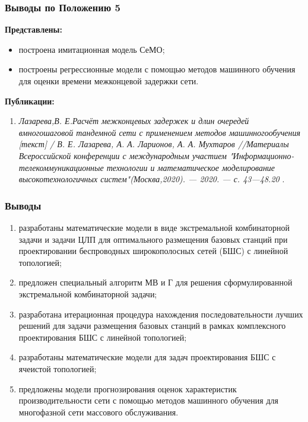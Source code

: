 \begin{frame}
    \frametitle{Выводы по Положению 5}
    \fontsize{8pt}{7.2}\selectfont

    \textbf{Представлены:}
    \begin{itemize}
        \item построена имитационная модель СеМО;
        \item построены регрессионные модели с помощью методов машинного обучения для оценки времени межконцевой задержки сети.
    \end{itemize}

    \bigskip
    \textbf{Публикации:}
    \begin{minipage}[c]{1\linewidth}
        \fontsize{6pt}{7.2}\selectfont
        \begin{enumerate}
            \item \textit{Лазарева,В. Е.Расчёт межконцевых задержек и длин очередей вмногошаговой тандемной сети с применением методов машинногообучения [текст] / В. Е. Лазарева, А. А. Ларионов, А. А. Мухтаров //Материалы Всероссийской конференции с международным уча­стием "Информационно-телекоммуникационные технологии и мате­матическое моделирование высокотехнологичных систем"(Москва,2020). — 2020. — с. 43—48.20
            }.
        \end{enumerate}
    \end{minipage}

\end{frame}

\begin{frame}
    \frametitle{Выводы}
    
    \begin{enumerate}
        \item разработаны математические модели в виде экстремальной комбинаторной задачи и
        задачи ЦЛП для оптимального размещения базовых станций при
        проектировании беспроводных широкополосных сетей (БШС) с линейной топологией;
        \item предложен специальный алгоритм МВ и Г для решения сформулированной
        экстремальной комбинаторной задачи;
        \item разработана итерационная процедура нахождения последовательности лучших
        решений для задачи размещения базовых станций в рамках комплексного
        проектирования БШС с линейной топологией;
        \item разработаны математические модели для задач проектирования БШС с ячеистой
        топологией;
        \item предложены модели прогнозирования оценок характеристик производительности сети с
        помощью методов машинного обучения для многофазной сети массового обслуживания.
    \end{enumerate}
\end{frame}


